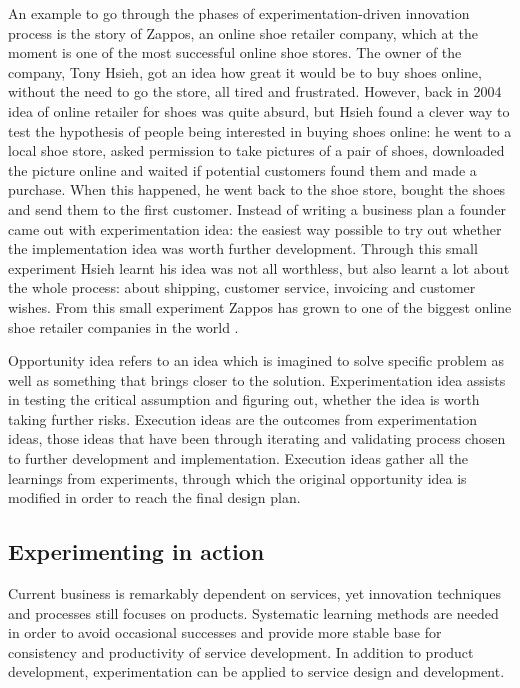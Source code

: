 An example to go through the phases of experimentation-driven innovation process is the story of Zappos, an online shoe retailer company, which at the moment is one of the most successful online shoe stores. The owner of the company, Tony Hsieh, got an idea how great it would be to buy shoes online, without the need to go the store, all tired and frustrated. However, back in 2004 idea of online retailer for shoes was quite absurd, but Hsieh found a clever way to test the hypothesis of people being interested in buying shoes online: he went to a local shoe store, asked permission to take pictures of a pair of shoes, downloaded the picture online and waited if potential customers found them and made a purchase. When this happened, he went back to the shoe store, bought the shoes and send them to the first customer. Instead of writing a business plan a founder came out with experimentation idea: the easiest way possible to try out whether the implementation idea was worth further development. \citep{hsieh2010delivering}  Through this small experiment Hsieh learnt his idea was not all worthless, but also learnt a lot about the whole process: about shipping, customer service, invoicing and customer wishes. From this small experiment Zappos has grown to one of the biggest online shoe retailer companies in the world \citep{hsieh2010delivering}. 

Opportunity idea refers to an idea which is imagined to solve specific problem as well as something that brings closer to the solution. Experimentation idea assists in testing the critical assumption and figuring out, whether the idea is worth taking further risks. Execution ideas are the outcomes from experimentation ideas, those ideas that have been through iterating and validating process chosen to further development and implementation. Execution ideas gather all the learnings from experiments, through which the original opportunity idea is modified in order to reach the final design plan.\citep{tuulenmaki2011art} 

\subsection{Experimenting in action}
Current business is remarkably dependent on services, yet innovation techniques and processes still focuses on products. Systematic learning methods are needed in order to avoid occasional successes and provide more stable base for consistency and productivity of service development. In addition to product development, experimentation can be applied to service design and development. \citep{thomke2003r} 

